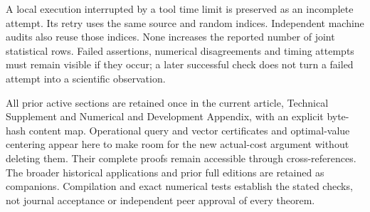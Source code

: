 A local execution interrupted by a tool time limit is preserved as an incomplete attempt. Its retry uses the same source and random indices. Independent machine audits also reuse those indices. None increases the reported number of joint statistical rows. Failed assertions, numerical disagreements and timing attempts must remain visible if they occur; a later successful check does not turn a failed attempt into a scientific observation.

All prior active sections are retained once in the current article, Technical Supplement and Numerical and Development Appendix, with an explicit byte-hash content map. Operational query and vector certificates and optimal-value centering appear here to make room for the new actual-cost argument without deleting them. Their complete proofs remain accessible through cross-references. The broader historical applications and prior full editions are retained as companions. Compilation and exact numerical tests establish the stated checks, not journal acceptance or independent peer approval of every theorem.
